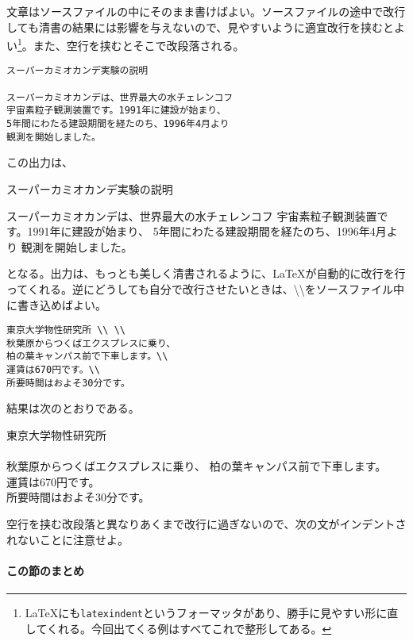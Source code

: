 文章はソースファイルの中にそのまま書けばよい。ソースファイルの途中で改行しても清書の結果には影響を与えないので、見やすいように適宜改行を挟むとよい\footnote{\LaTeX にも\texttt{latexindent}というフォーマッタがあり、勝手に見やすい形に直してくれる。今回出てくる例はすべてこれで整形してある。}。また、空行を挟むとそこで改段落される。
\begin{reidai}
    \begin{verbatim}
スーパーカミオカンデ実験の説明

スーパーカミオカンデは、世界最大の水チェレンコフ
宇宙素粒子観測装置です。1991年に建設が始まり、
5年間にわたる建設期間を経たのち、1996年4月より
観測を開始しました。
\end{verbatim}
\end{reidai} \noindent
この出力は、
\begin{kekka}
    スーパーカミオカンデ実験の説明

    スーパーカミオカンデは、世界最大の水チェレンコフ
    宇宙素粒子観測装置です。1991年に建設が始まり、
    5年間にわたる建設期間を経たのち、1996年4月より
    観測を開始しました。
\end{kekka} \noindent
となる。出力は、もっとも美しく清書されるように、\LaTeX が自動的に改行を行ってくれる。逆にどうしても自分で改行させたいときは、\textbackslash \textbackslash をソースファイル中に書き込めばよい。
\begin{reidai}
    \begin{verbatim}
東京大学物性研究所 \\ \\
秋葉原からつくばエクスプレスに乗り、
柏の葉キャンパス前で下車します。\\
運賃は670円です。\\
所要時間はおよそ30分です。
\end{verbatim}
\end{reidai} \noindent
結果は次のとおりである。
\begin{kekka}
    東京大学物性研究所 \\ \\
    秋葉原からつくばエクスプレスに乗り、
    柏の葉キャンパス前で下車します。\\
    運賃は670円です。\\
    所要時間はおよそ30分です。
\end{kekka}

空行を挟む改段落と異なりあくまで改行に過ぎないので、次の文がインデントされないことに注意せよ。

\paragraph{この節のまとめ}

